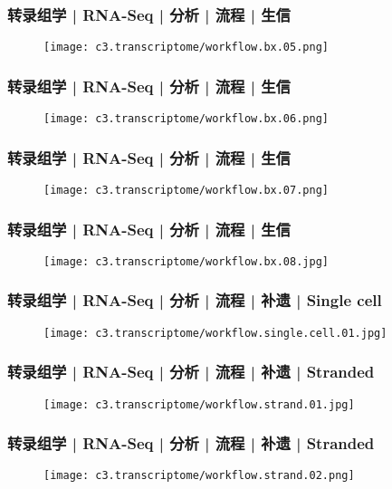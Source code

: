 \begin{frame}
  \frametitle{转录组学 | RNA-Seq | 分析 | 流程 | 生信}
  \begin{figure}
    \centering
    \texttt{[image: c3.transcriptome/workflow.bx.05.png]}
  \end{figure}
\end{frame}

\begin{frame}
  \frametitle{转录组学 | RNA-Seq | 分析 | 流程 | 生信}
  \begin{figure}
    \centering
    \texttt{[image: c3.transcriptome/workflow.bx.06.png]}
  \end{figure}
\end{frame}

\begin{frame}
  \frametitle{转录组学 | RNA-Seq | 分析 | 流程 | 生信}
  \begin{figure}
    \centering
    \texttt{[image: c3.transcriptome/workflow.bx.07.png]}
  \end{figure}
\end{frame}

\begin{frame}
  \frametitle{转录组学 | RNA-Seq | 分析 | 流程 | 生信}
  \begin{figure}
    \centering
    \texttt{[image: c3.transcriptome/workflow.bx.08.jpg]}
  \end{figure}
\end{frame}

\begin{frame}
  \frametitle{转录组学 | RNA-Seq | 分析 | 流程 | 补遗 | Single cell}
  \begin{figure}
    \centering
    \texttt{[image: c3.transcriptome/workflow.single.cell.01.jpg]}
  \end{figure}
\end{frame}

\begin{frame}
  \frametitle{转录组学 | RNA-Seq | 分析 | 流程 | 补遗 | Stranded}
  \begin{figure}
    \centering
    \texttt{[image: c3.transcriptome/workflow.strand.01.jpg]}
  \end{figure}
\end{frame}

\begin{frame}
  \frametitle{转录组学 | RNA-Seq | 分析 | 流程 | 补遗 | Stranded}
  \begin{figure}
    \centering
    \texttt{[image: c3.transcriptome/workflow.strand.02.png]}
  \end{figure}
\end{frame}

